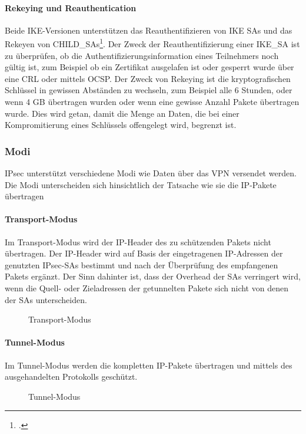\paragraph{Rekeying und Reauthentication}
Beide IKE-Versionen unterstützen das Reauthentifizieren von IKE SAs und das Rekeyen
von CHILD\_SAs\footcite[][616]{charlie_kaufman_rfc_2014}.
Der Zweck der Reauthentifizierung einer IKE\_SA ist zu überprüfen, ob die Authentifizierungsinformation
eines Teilnehmers noch gültig ist, zum Beispiel ob ein Zertifikat ausgelafen ist oder gesperrt
wurde über eine \ac{CRL} oder mittels \ac{OCSP}.
Der Zweck von Rekeying ist die kryptografischen Schlüssel in gewissen Abständen zu wechseln,
zum Beispiel alle 6 Stunden, oder wenn 4 GB übertragen wurden oder wenn eine gewisse Anzahl
Pakete übertragen wurde. Dies wird getan, damit die Menge an Daten, die bei einer Kompromitierung
eines Schlüssels offengelegt wird, begrenzt ist.


\subsubsection{Modi}
\ac{IPsec} unterstützt verschiedene Modi wie Daten über das VPN versendet werden.
Die Modi unterscheiden sich hinsichtlich der Tatsache wie sie die \ac{IP}-Pakete übertragen
\paragraph{Transport-Modus}
Im Transport-Modus wird der \ac{IP}-Header des zu schützenden Pakets nicht übertragen.
Der IP-Header wird auf Basis der eingetragenen IP-Adressen der genutzten \ac{IPsec}-\acp{SA}
bestimmt und nach der Überprüfung des empfangenen Pakets ergänzt. Der Sinn dahinter ist, dass
der Overhead der \acp{SA} verringert wird, wenn die Quell- oder Zieladressen der getunnelten Pakete
sich nicht von denen der \acp{SA} unterscheiden.
\begin{figure}[h!]
    \caption{Transport-Modus}
    \label{fig:Transport-Modus}
    \centering
    \def\svgwidth{\columnwidth}
    
\end{figure}

\paragraph{Tunnel-Modus}
Im Tunnel-Modus werden die kompletten \ac{IP}-Pakete übertragen und mittels des ausgehandelten
Protokolls geschützt.

\begin{figure}[h!]
    \caption{Tunnel-Modus}
    \label{fig:Tunnel-Modus}
    \centering
    \def\svgwidth{\columnwidth}
    
\end{figure}

